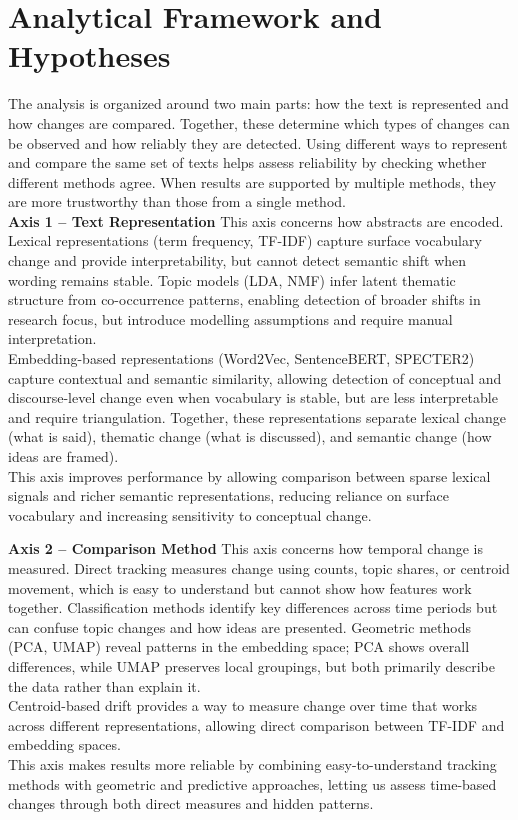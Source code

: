 \section{Analytical Framework and Hypotheses}

The analysis is organized around two main parts: how the text is represented and how changes are compared. Together, these determine which types of changes can be observed and how reliably they are detected. Using different ways to represent and compare the same set of texts helps assess reliability by checking whether different methods agree. When results are supported by multiple methods, they are more trustworthy than those from a single method.\\

\textbf{Axis 1 -- Text Representation} \newline
This axis concerns how abstracts are encoded. Lexical representations (term frequency, TF-IDF) capture surface vocabulary change and provide interpretability, but cannot detect semantic shift when wording remains stable. Topic models (LDA, NMF) infer latent thematic structure from co-occurrence patterns, enabling detection of broader shifts in research focus, but introduce modelling assumptions and require manual interpretation. \\ Embedding-based representations (Word2Vec, SentenceBERT, SPECTER2) capture contextual and semantic similarity, allowing detection of conceptual and discourse-level change even when vocabulary is stable, but are less interpretable and require triangulation. Together, these representations separate lexical change (what is said), thematic change (what is discussed), and semantic change (how ideas are framed).\\
This axis improves performance by allowing comparison between sparse lexical signals and richer semantic representations, reducing reliance on surface vocabulary and increasing sensitivity to conceptual change.\newline

\textbf{Axis 2 -- Comparison Method} \newline
This axis concerns how temporal change is measured.
Direct tracking measures change using counts, topic shares, or centroid movement, which is easy to understand but cannot show how features work together. Classification methods identify key differences across time periods but can confuse topic changes and how ideas are presented. Geometric methods (PCA, UMAP) reveal patterns in the embedding space; PCA shows overall differences, while UMAP preserves local groupings, but both primarily describe the data rather than explain it.\\
Centroid-based drift provides a way to measure change over time that works across different representations, allowing direct comparison between TF-IDF and embedding spaces.\\
This axis makes results more reliable by combining easy-to-understand tracking methods with geometric and predictive approaches, letting us assess time-based changes through both direct measures and hidden patterns.\\

